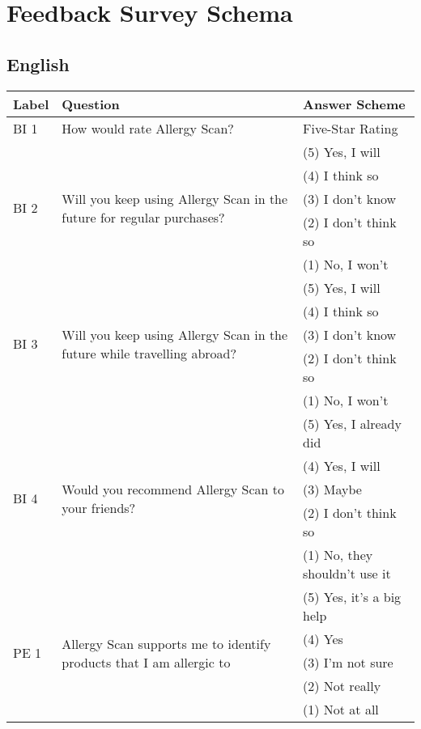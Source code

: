 \chapter{Feedback Survey Schema}
\label{chap:feedback-schema}

\section*{English}
\centering
\begin{longtable}{p{1cm} p{8cm} p{5.5cm}}
\toprule
Label & Question & Answer Scheme\\
\midrule

BI 1 & How would rate Allergy Scan? & Five-Star Rating \\

\hline

\multirow{5}{*}{BI 2}
& \multirow{5}{8cm}{Will you keep using Allergy Scan in the future for regular purchases?}
& (5) Yes, I will\\ 
& & (4) I think so\\
& & (3) I don't know\\
& & (2) I don't think so\\
& & (1) No, I won't\\

\hline

\multirow{5}{*}{BI 3}
& \multirow{5}{8cm}{Will you keep using Allergy Scan in the future while travelling abroad?}
& (5) Yes, I will\\ 
& & (4) I think so\\
& & (3) I don't know\\
& & (2) I don't think so\\
& & (1) No, I won't \\

\hline

\multirow{5}{*}{BI 4}
& \multirow{5}{8cm}{Would you recommend Allergy Scan to your friends?}
& (5) Yes, I already did\\ 
& & (4) Yes, I will\\
& & (3) Maybe\\
& & (2) I don't think so\\
& & (1) No, they shouldn't use it\\

\hline

\multirow{5}{*}{PE 1}
& \multirow{5}{8cm}{Allergy Scan supports me to identify products that I am allergic to}
& (5) Yes, it's a big help\\ 
& & (4) Yes\\
& & (3) I'm not sure\\
& & (2) Not really\\
& & (1) Not at all\\


\end{longtable}
